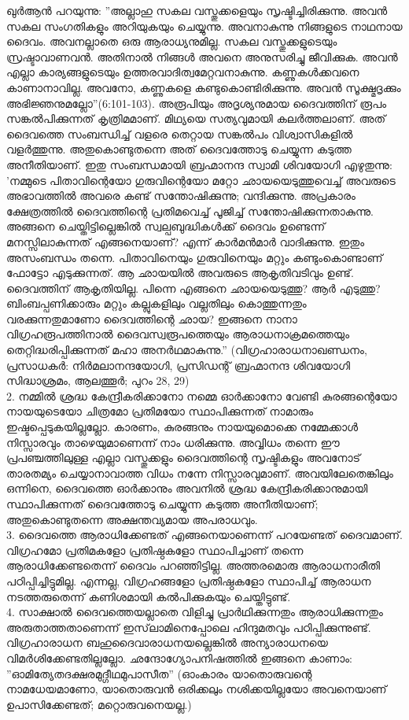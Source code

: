 ഖുര്‍ആന്‍ പറയുന്നു: ''അല്ലാഹു സകല വസ്തുക്കളെയും സൃഷ്ടിച്ചിരിക്കുന്നു. അവന്‍ സകല സംഗതികളും അറിയുകയും ചെയ്യുന്നു. അവനാകുന്നു നിങ്ങളുടെ നാഥനായ ദൈവം. അവനല്ലാതെ ഒരു ആരാധ്യനുമില്ല. സകല വസ്തുക്കളുടെയും സ്രഷ്ടാവാണവന്‍. അതിനാല്‍ നിങ്ങള്‍ അവനെ അനുസരിച്ചു ജീവിക്കുക. അവന്‍ എല്ലാ കാര്യങ്ങളുടെയും ഉത്തരവാദിത്വമേറ്റവനാകുന്നു. കണ്ണുകള്‍ക്കവനെ കാണാനാവില്ല. അവനോ, കണ്ണുകളെ കണ്ടുകൊണ്ടിരിക്കുന്നു. അവന്‍ സൂക്ഷ്മദൃക്കും അഭിജ്ഞനുമല്ലോ''(6:101-103).
അരൂപിയും അദൃശ്യനുമായ ദൈവത്തിന് രൂപം സങ്കല്‍പിക്കുന്നത് കൃത്രിമമാണ്. മിഥ്യയെ സത്യവുമായി കലര്‍ത്തലാണ്. അത് ദൈവത്തെ സംബന്ധിച്ച് വളരെ തെറ്റായ സങ്കല്‍പം വിശ്വാസികളില്‍ വളര്‍ത്തുന്നു. അതുകൊണ്ടുതന്നെ അത് ദൈവത്തോടു ചെയ്യുന്ന കടുത്ത അനീതിയാണ്.
ഇതു സംബന്ധമായി ബ്രഹ്മാനന്ദ സ്വാമി ശിവയോഗി എഴുതുന്നു: 'നമ്മുടെ പിതാവിന്റെയോ ഗുരുവിന്റെയോ മറ്റോ ഛായയെടുത്തുവെച്ച് അവരുടെ അഭാവത്തില്‍ അവരെ കണ്ട് സന്തോഷിക്കുന്നു; വന്ദിക്കുന്നു. അപ്രകാരം ക്ഷേത്രത്തില്‍ ദൈവത്തിന്റെ പ്രതിമവെച്ച് പൂജിച്ച് സന്തോഷിക്കുന്നതാകുന്നു. അങ്ങനെ ചെയ്തിട്ടില്ലെങ്കില്‍ സ്വല്പബുദ്ധികള്‍ക്ക് ദൈവം ഉണ്ടെന്ന് മനസ്സിലാകുന്നത് എങ്ങനെയാണ്? എന്ന് കാര്‍മന്‍മാര്‍ വാദിക്കുന്നു. ഇതും അസംബന്ധം തന്നെ. പിതാവിനെയും ഗുരുവിനെയും മറ്റും കണ്ടുംകൊണ്ടാണ് ഫോട്ടോ എടുക്കുന്നത്. ആ ഛായയില്‍ അവരുടെ ആകൃതിവടിവും ഉണ്ട്. ദൈവത്തിന് ആകൃതിയില്ല. പിന്നെ എങ്ങനെ ഛായയെടുത്തു? ആര്‍ എടുത്തു? ബിംബപ്പണിക്കാരും മറ്റും കല്ലുകളിലും വല്ലതിലും കൊത്തുന്നതും വരക്കുന്നതുമാണോ ദൈവത്തിന്റെ ഛായ? ഇങ്ങനെ നാനാ വിഗ്രഹരൂപത്തിനാല്‍ ദൈവസ്വരൂപത്തെയും ആരാധനാക്രമത്തെയും തെറ്റിദ്ധരിപ്പിക്കുന്നത് മഹാ അനര്‍ഥമാകുന്നു.'' (വിഗ്രഹാരാധനാഖണ്ഡനം, പ്രസാധകര്‍: നിര്‍മലാനന്ദയോഗി, പ്രസിഡന്റ് ബ്രഹ്മാനന്ദ ശിവയോഗി സിദ്ധാശ്രമം, ആലത്തൂര്‍; പുറം 28, 29)\\
2. നമ്മില്‍ ശ്രദ്ധ കേന്ദ്രീകരിക്കാനോ നമ്മെ ഓര്‍ക്കാനോ വേണ്ടി കുരങ്ങന്റെയോ നായയുടെയോ ചിത്രമോ പ്രതിമയോ സ്ഥാപിക്കുന്നത് നാമാരും ഇഷ്ടപ്പെടുകയില്ലല്ലോ. കാരണം, കുരങ്ങനും നായയുമൊക്കെ നമ്മേക്കാള്‍ നിസ്സാരവും താഴെയുമാണെന്ന് നാം ധരിക്കുന്നു. അവ്വിധം തന്നെ ഈ പ്രപഞ്ചത്തിലുള്ള എല്ലാ വസ്തുക്കളും ദൈവത്തിന്റെ സൃഷ്ടികളും അവനോട് താരതമ്യം ചെയ്യാനാവാത്ത വിധം നന്നേ നിസ്സാരവുമാണ്. അവയിലേതെങ്കിലും ഒന്നിനെ, ദൈവത്തെ ഓര്‍ക്കാനും അവനില്‍ ശ്രദ്ധ കേന്ദ്രീകരിക്കാനുമായി സ്ഥാപിക്കുന്നത് ദൈവത്തോടു ചെയ്യുന്ന കടുത്ത അനീതിയാണ്; അതുകൊണ്ടുതന്നെ അക്ഷന്തവ്യമായ അപരാധവും.\\
3. ദൈവത്തെ ആരാധിക്കേണ്ടത് എങ്ങനെയാണെന്ന് പറയേണ്ടത് ദൈവമാണ്. വിഗ്രഹമോ പ്രതിമകളോ പ്രതിഷ്ഠകളോ സ്ഥാപിച്ചാണ് തന്നെ ആരാധിക്കേണ്ടതെന്ന് ദൈവം പറഞ്ഞിട്ടില്ല. അത്തരമൊരു ആരാധനാരീതി പഠിപ്പിച്ചിട്ടുമില്ല. എന്നല്ല, വിഗ്രഹങ്ങളോ പ്രതിഷ്ഠകളോ സ്ഥാപിച്ച് ആരാധന നടത്തരുതെന്ന് കണിശമായി കല്‍പിക്കുകയും ചെയ്തിട്ടുണ്ട്.\\
4. സാക്ഷാല്‍ ദൈവത്തെയല്ലാതെ വിളിച്ചു പ്രാര്‍ഥിക്കുന്നതും ആരാധിക്കുന്നതും അരുതാത്തതാണെന്ന് ഇസ്‌ലാമിനെപ്പോലെ ഹിന്ദുമതവും പഠിപ്പിക്കുന്നുണ്ട്. വിഗ്രഹാരാധന ബഹുദൈവാരാധനയല്ലെങ്കില്‍ അന്യാരാധനയെ വിമര്‍ശിക്കേണ്ടതില്ലല്ലോ. ഛന്ദോഗ്യോപനിഷത്തില്‍ ഇങ്ങനെ കാണാം: ''ഓമിത്യേതദക്ഷരമുദ്ഗീഥമുപാസീത'' (ഓംകാരം യാതൊരുവന്റെ നാമധേയമാണോ, യാതൊരുവന്‍ ഒരിക്കലും നശിക്കയില്ലയോ അവനെയാണ് ഉപാസിക്കേണ്ടത്; മറ്റൊരുവനെയല്ല.)
